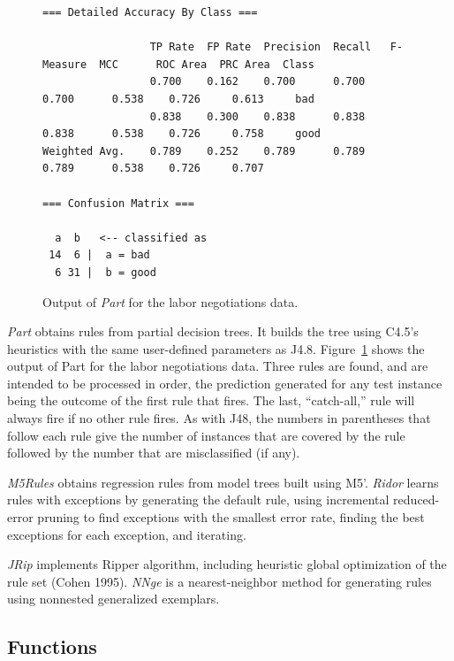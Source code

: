 \begin{figure}[!p]
\begin{mdframed}[innermargin=-1.5cm]
\begin{Verbatim}[fontsize=\scriptsize]
=== Detailed Accuracy By Class ===

                 TP Rate  FP Rate  Precision  Recall   F-Measure  MCC      ROC Area  PRC Area  Class
                 0.700    0.162    0.700      0.700    0.700      0.538    0.726     0.613     bad
                 0.838    0.300    0.838      0.838    0.838      0.538    0.726     0.758     good
Weighted Avg.    0.789    0.252    0.789      0.789    0.789      0.538    0.726     0.707     

=== Confusion Matrix ===

  a  b   <-- classified as
 14  6 |  a = bad
  6 31 |  b = good
\end{Verbatim}
\end{mdframed}
\caption{\label{fig:part_output}Output of \textit{Part} for the labor negotiations data.}
\end{figure}

\textit{Part} obtains rules from partial decision trees. It builds the
tree using C4.5's heuristics with the same user-defined parameters as
J4.8. Figure~\ref{fig:part_output} shows the output of Part for the
labor negotiations data. Three rules are found, and are intended to be
processed in order, the prediction generated for any test instance
being the outcome of the first rule that fires. The last, ``catch-all,''
rule will always fire if no other rule fires. As with J48, the numbers in parentheses that
follow each rule give the number of instances that are covered by the
rule followed by the number that are misclassified (if any).

\textit{M5Rules} obtains regression rules from model trees built using
M5'. \textit{Ridor} learns rules with exceptions by generating the
default rule, using incremental reduced-error pruning to find
exceptions with the smallest error rate, finding the best exceptions
for each exception, and iterating.

\textit{JRip} implements Ripper algorithm, including heuristic global
optimization of the rule set (Cohen 1995). \textit{NNge} is a
nearest-neighbor method for generating rules using nonnested
generalized exemplars.

\subsection{Functions}

